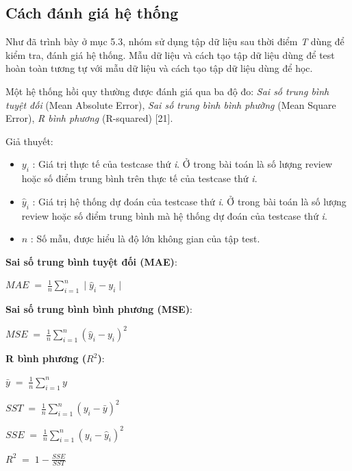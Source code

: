 \documentclass[12pt]{extarticle}
\begin{document}
		\subsection{Cách đánh giá hệ thống}
			\par Như đã trình bày ở mục 5.3, nhóm sử dụng tập dữ liệu sau thời điểm \textit{T} dùng để kiểm tra, đánh giá hệ thống. Mẫu dữ liệu và cách tạo tập dữ liệu dùng để test hoàn toàn tương tự với mẫu dữ liệu và cách tạo tập dữ liệu dùng để học.
			\par Một hệ thống hồi quy thường được đánh giá qua ba độ đo: \textit{Sai số trung bình tuyệt đối} (Mean Absolute Error), \textit{Sai số trung bình bình phường} (Mean Square Error), \textit{R bình phương} (R-squared) [21].
			\par Giả thuyết: 
			 \begin{itemize}
				\item $y_{i}$ : Giá trị thực tế của testcase thứ  \textit{i}. Ở trong bài toán là số lượng review hoặc số điểm trung bình trên thực tế của testcase thứ  \textit{i}.
				\item $\hat{y}_{i}$ : Giá trị hệ thống dự đoán của testcase thứ  \textit{i}. Ở trong bài toán là số lượng review hoặc số điểm trung bình mà hệ thống dự đoán của testcase thứ  \textit{i}.
				\item $n$ : Số mẫu, được hiểu là độ lớn không gian của tập test.
			\end{itemize}
			\par \textbf{Sai số trung bình tuyệt đối (MAE)}: 
				\large
				\begin{center}
					$MAE\;=\;\frac{1}{n}\sum_{i=1}^n\mid \hat{y}_{i}-y_{i}\mid$
				\end{center}
				\normalsize
			\par \textbf{Sai số trung bình bình phương (MSE)}:
				\large
				\begin{center}
					$MSE\;=\;\frac{1}{n}\sum_{i=1}^n(\hat{y}_{i}-y_{i})^{2}$
				\end{center}
				\normalsize
			\par \textbf{R bình phương ($R^{2}$)}:
				\large
				\begin{center}
					\par $\bar{y}\;=\;\frac{1}{n}\sum_{i=1}^ny$ \\[10pt]
					\par $SST\;=\;\frac{1}{n}\sum_{i=1}^n(y_{i}-\bar{y})^{2}$ \\[10pt]
					\par $SSE\;=\;\frac{1}{n}\sum_{i=1}^n(y_{i}-\hat{y}_{i})^{2}$ \\[10pt]
					\par $R^{2}\;=\;1-\frac{SSE}{SST}$
				\end{center}
				\normalsize
\end{document}
